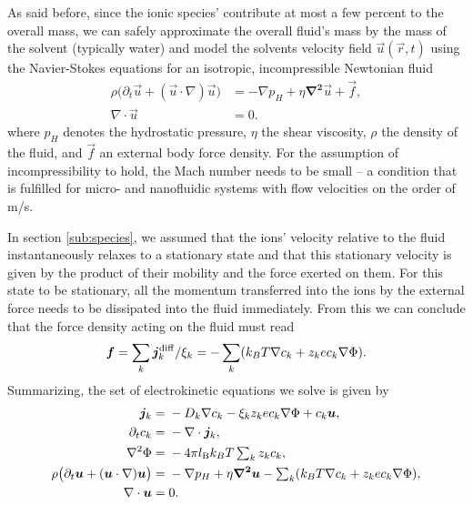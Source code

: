As said before, since the ionic species' contribute at most a few percent to the overall mass, we can safely approximate the overall fluid's mass by the mass of the solvent (typically water) and model the solvents velocity field $\vec{u}(\vec{r}, t)$ using the Navier-Stokes equations for an isotropic, incompressible Newtonian fluid
%
\begin{align}
\label{eq:NS}
\rho \big( \partial_t \vec{u} + \left(\vec{u} \cdot \nabla \right) \vec{u} \big) &= -\nabla p_H + \eta \bm{\nabla^{2}} \vec{u} + \vec{f} ,\\
\nabla \cdot \vec u &= 0 .
\end{align}
%
where $p_H$ denotes the hydrostatic pressure, $\eta$ the shear viscosity, $\rho$ the density of the fluid, and $\vec{f}$ an external body force density. For the assumption of incompressibility to hold, the Mach number needs to be small -- a condition that is fulfilled for micro- and nanofluidic systems with flow velocities on the order of \textmu m/s.

In section \ref{sub:species}, we assumed that the ions' velocity relative to the fluid instantaneously relaxes to a stationary state and that this stationary velocity is given by the product of their mobility and the force exerted on them. For this state to be stationary, all the momentum transferred into the ions by the external force needs to be dissipated into the fluid immediately. From this we can conclude that the force density acting on the fluid must read
%
\begin{equation}
\label{eq:forcedens}
\bm{f} = \sum_{k} \bm{j}^\mathrm{diff}_k / \xi_{k} = -\sum_{k} (k_{B}T \nabla c_{k} + z_{k} e c_{k} \nabla \Phi) .
\end{equation}
%
Summarizing, the set of electrokinetic equations we solve is given by
%
\begin{align}
\bm{j}_{k} ={}& -D_{k} \nabla c_{k} - \xi_{k} z_{k} e c_{k} \nabla \Phi + c_{k} \bm{u} ,\label{eq:flux}\\
\partial_{t} c_{k} ={}& -\nabla \cdot\bm{j}_{k} ,\label{eq:conti}\\
\nabla^2 \Phi ={}& -4 \pi l_\mathrm{B} k_{B}T \textstyle\sum_{k} z_{k} c_{k} ,\label{eq:poisson}\\
\rho \big( \partial_t \bm{u} + (\bm{u} \cdot \nabla ) \bm{u} \big) ={}& -\nabla p_H + \eta \bm{\nabla^{2}} \bm{u} - \textstyle\sum_{k} (k_{B}T \nabla c_{k} + z_{k} e c_{k} \nabla \Phi) ,\label{eq:ns}\\
\nabla \cdot \bm{u} ={}& 0 .\label{eq:incomp}
\end{align}

